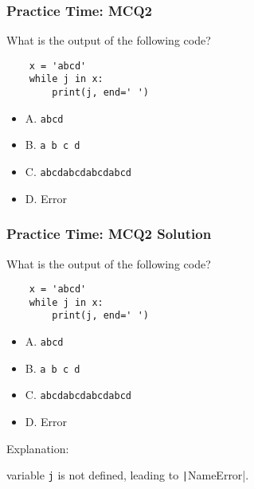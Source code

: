 \documentclass{beamer}
\begin{document}
\begin{frame}[fragile]
    \frametitle{Practice Time: MCQ2}
    What is the output of the following code?
    \begin{verbatim}
    x = 'abcd'
    while j in x:
        print(j, end=' ')
    \end{verbatim}
    \begin{itemize}
        \item A. \texttt{abcd}
        \item B. \texttt{a b c d}
        \item C. \texttt{abcdabcdabcdabcd}
        \item D. Error
    \end{itemize}
\end{frame}
\begin{frame}[fragile]
    \frametitle{Practice Time: MCQ2 Solution}
    What is the output of the following code?
    \begin{verbatim}
    x = 'abcd'
    while j in x:
        print(j, end=' ')
    \end{verbatim}
    \begin{itemize}
        \item A. \texttt{abcd}
        \item B. \texttt{a b c d}
        \item C. \texttt{abcdabcdabcdabcd}
        \item \alert{D. Error}
    \end{itemize}

    Explanation:

    variable \texttt{j} is not defined, leading to \texttt|NameError|.
\end{frame}
\end{document}
